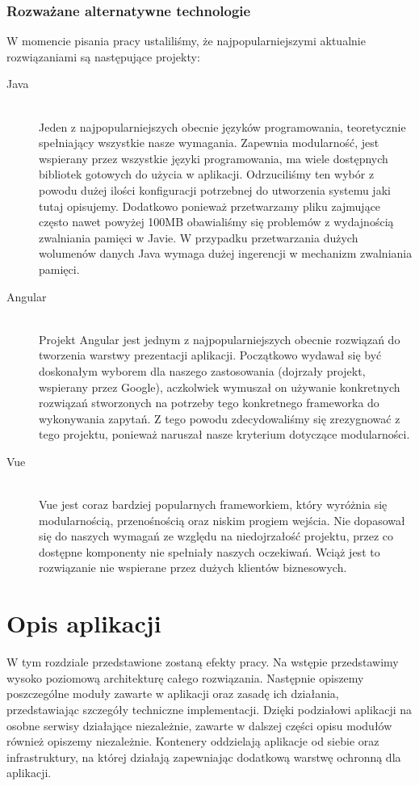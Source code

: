 \documentclass[a4paper,11pt,twoside]{report}
\theoremstyle{definition}
\begin{document}
\subsection{Rozważane alternatywne technologie}
W momencie pisania pracy ustaliliśmy, że najpopularniejszymi aktualnie rozwiązaniami są następujące projekty:
	  
\begin{description}
	\item [Java] \hfill \\
	Jeden z najpopularniejszych obecnie języków programowania, teoretycznie spełniający wszystkie nasze wymagania. Zapewnia modularność, jest wspierany przez wszystkie języki programowania, ma wiele dostępnych bibliotek gotowych do użycia w aplikacji. Odrzuciliśmy ten wybór z powodu dużej ilości konfiguracji potrzebnej do utworzenia systemu jaki tutaj opisujemy. Dodatkowo ponieważ przetwarzamy pliku zajmujące często nawet powyżej 100MB obawialiśmy się problemów z wydajnością zwalniania pamięci w Javie. W przypadku przetwarzania dużych wolumenów danych Java wymaga dużej ingerencji w mechanizm zwalniania pamięci.
\item[Angular] \hfill \\
  	Projekt Angular jest jednym z najpopularniejszych obecnie rozwiązań do tworzenia warstwy prezentacji aplikacji. Początkowo wydawał się być doskonałym wyborem dla naszego zastosowania (dojrzały projekt, wspierany przez Google), aczkolwiek wymuszał on używanie konkretnych rozwiązań stworzonych na potrzeby tego konkretnego frameworka do wykonywania zapytań. Z tego powodu zdecydowaliśmy się zrezygnować z tego projektu, ponieważ naruszał nasze kryterium dotyczące modularności.
\item[Vue] \hfill \\
	Vue jest coraz bardziej popularnych frameworkiem, który wyróżnia się modularnością, przenośnością oraz niskim progiem wejścia. Nie dopasował się do naszych wymagań ze względu na niedojrzałość projektu, przez co dostępne komponenty nie spełniały naszych oczekiwań. Wciąż jest to rozwiązanie nie wspierane przez dużych klientów biznesowych.
\end{description}

\chapter{Opis aplikacji}
W tym rozdziale przedstawione zostaną efekty pracy. Na wstępie przedstawimy wysoko poziomową architekturę całego rozwiązania. Następnie opiszemy poszczególne moduły zawarte w aplikacji oraz zasadę ich działania, przedstawiając szczegóły techniczne implementacji. Dzięki podziałowi aplikacji na osobne serwisy działające niezależnie, zawarte w dalszej części opisu modułów również opiszemy niezależnie. Kontenery oddzielają aplikacje od siebie oraz infrastruktury, na której działają zapewniając dodatkową warstwę ochronną dla aplikacji.
\end{document}
